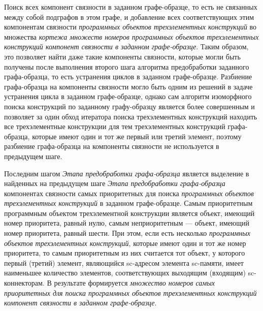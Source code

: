 \begin{SCn}
\begin{scnsubstruct}
\begin{scnsubstruct}
\begin{scnsubstruct}
\begin{scnsubstruct}
\begin{scnsubstruct}
\begin{scnsubstruct}
\begin{scnsubstruct}
\begin{scnsubstruct}
{\begin{scnitemize}
				\item Поиск всех компонент связности в заданном графе-образце, то есть не связанных между собой подграфов в этом графе, и добавление всех соответствующих этим компонентам связности \textit{программных объектов трехэлементных конструкций} во множества \textit{кортежа множеств номеров программных объектов трехэлементных конструкций компонент связности в заданном графе-образце}. Таким образом, это позволяет найти даже такие компоненты связности, которые могли быть получены после выполнения второго шага алгоритма предобработки заданного графа-образца, то есть устранения циклов в заданном графе-образце. Разбиение графа-образца на компоненты связности могло быть одним из решений в задаче устранения цикла в заданном графе-образце, однако сам алгоритм изоморфного поиска конструкций по заданному графу-образцу является более совершенным и позволяет за один обход итератора поиска трехэлементных конструкций находить все трехэлементные конструкции для тем трехэлементных конструкций графа-образца, которые имеют один и тот же первый или третий элемент, поэтому разбиение графа-образца на компоненты связности не используется в предыдущем шаге.
				\item Последним шагом \textit{Этапа предобработки графа-образца} является выделение в найденных на предыдущем шаге \textit{Этапа предобработки графа-образца} компонентах связности самых приоритетных для поиска \textit{программных объектов трехэлементных конструкций} в заданном графе-образце. Самым приоритетным программным объектом трехэлементной конструкции является объект, имеющий номер приоритета, равный нулю, самым неприоритетным --- объект, имеющий номер приоритета, равный шести. При этом, если есть несколько \textit{программных объектов трехэлементных конструкций}, которые имеют один и тот же номер приоритета, то самым приоритетным из них считается тот объект, у которого первый (третий) элемент, являющийся sc-адресом элемента sc-памяти, имеет наименьшее количество элементов, соответствующих выходящим (входящим) sc-коннекторам. В результате формируется \textit{множество номеров самых приоритетных для поиска программных объектов трехэлементных конструкций компонент связности в заданном графе-образце}.
			\end{scnitemize}
			
}
\end{scnsubstruct}
\end{scnsubstruct}
\end{scnsubstruct}
\end{scnsubstruct}
\end{scnsubstruct}
\end{scnsubstruct}
\end{scnsubstruct}
\end{scnsubstruct}
\end{SCn}
